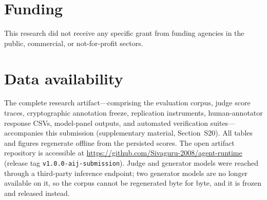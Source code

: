 \section*{Funding}
This research did not receive any specific grant from funding agencies in the public, commercial, or not-for-profit sectors.

\section*{Data availability}
The complete research artifact---comprising the evaluation corpus, judge score traces, cryptographic annotation freeze, replication instruments, human-annotator response CSVs, model-panel outputs, and automated verification suites---accompanies this submission (supplementary material, Section~S20). All tables and figures regenerate offline from the persisted scores. The open artifact repository is accessible at \url{https://github.com/Sivaguru-2008/agent-runtime} (release tag \texttt{v1.0.0-aij-submission}). Judge and generator models were reached through a third-party inference endpoint; two generator models are no longer available on it, so the corpus cannot be regenerated byte for byte, and it is frozen and released instead.
